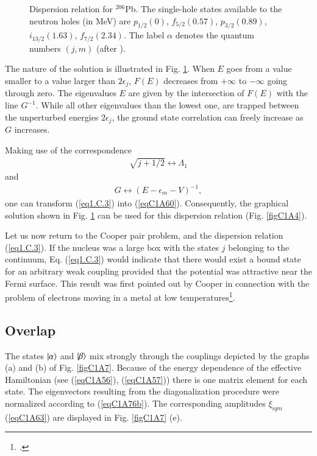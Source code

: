 \begin{subappendices}
\begin{figure}
{}
\caption{Dispersion relation for $^{206}$Pb. The single-hole states available to the  neutron holes (in MeV) are  $p_{1/2}(0)$, $f_{5/2}(0.57)$, $p_{3/2}(0.89)$, $i_{13/2}(1.63)$, $f_{7/2}(2.34)$. The label $\alpha$ denotes the quantum numbers $(j,m)$ (after \cite{Bayman:60a}).}
\label{fig1.C.1}
\end{figure}
The nature of the solution is illustrated in Fig. \ref{fig1.C.1}. When $E$ goes from a value smaller to a value larger than $2\epsilon_j$, $F(E)$ decreases from $+\infty$ to $-\infty$ going through zero. The eigenvalues $E$ are given by the intersection of $F(E)$ with the line $G^{-1}$. While all other eigenvalues than the lowest one, are trapped between the unperturbed energies $2\epsilon_j$, the ground state correlation can freely increase as $G$ increases.


Making use of the correspondence
\begin{align}\label{eq1.C.4}
\sqrt{j+1/2}\leftrightarrow\Lambda_1
\end{align}
and
\begin{align}\label{eq1.C.5}
G\leftrightarrow(E-\epsilon_m-V)^{-1},
\end{align}
one can transform (\ref{eq1.C.3}) into (\ref{eqC1A60}). Consequently, the graphical solution shown in Fig. \ref{fig1.C.1} can be used for this dispersion relation (Fig. \ref{figC1A4}).

Let us now return to the Cooper pair problem, and the dispersion relation (\ref{eq1.C.3}). If the nucleus was a large box with the states $j$ belonging to the continuum, Eq. (\ref{eq1.C.3}) would indicate that there would exist a bound state for an arbitrary weak coupling provided that the potential was attractive near the Fermi surface. This result was first pointed out by Cooper in connection with the problem of electrons moving in a metal at low temperatures\footnote{\cite{Cooper:56,Bayman:60a}.}.
 \subsection{Overlap}\label{AppCS2}
 The states $|{\alpha} \rangle$ and $|{\beta} \rangle$ mix strongly through the couplings depicted by the graphs (a) and (b) of Fig. \ref{figC1A7}. Because of the energy dependence of the effective Hamiltonian (see (\ref{eqC1A56}), (\ref{eqC1A57})) there is one matrix element for each state. The eigenvectors resulting from the diagonalization procedure were normalized according to (\ref{eqC1A76b}). The corresponding amplitudes $\xi_{iqm}$ (\ref{eqC1A63}) are displayed in Fig. \ref{figC1A7} (e).
 

\end{subappendices}
